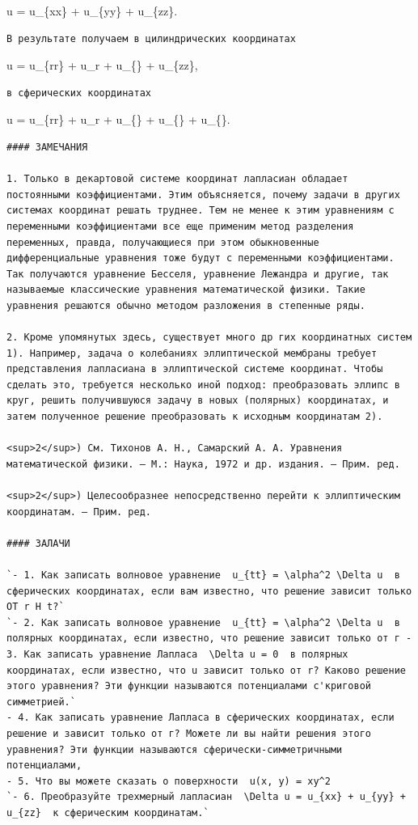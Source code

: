 \documentclass[
  ukrainian,
]{article}
\begin{document}
\Delta u = u\_\{xx\} + u\_\{yy\} + u\_\{zz\}.

\begin{verbatim}
В результате получаем в цилиндрических координатах
\end{verbatim}

\Delta u = u\_\{rr\} +  u\_r + 
u\_\{\theta\theta\} + u\_\{zz\},

\begin{verbatim}
в сферических координатах
\end{verbatim}

\Delta u = u\_\{rr\} +  u\_r + 
u\_\{\varphi\varphi\} + 
u\_\{\varphi\} +  u\_\{\theta\theta\}.

\begin{verbatim}
#### ЗАМЕЧАНИЯ

1. Только в декартовой системе координат лапласиан обладает постоянными коэффициентами. Этим объясняется, почему задачи в других системах координат решать труднее. Тем не менее к этим уравнениям с переменными коэффициентами все еще применим метод разделения переменных, правда, получающиеся при этом обыкновенные дифференциальные уравнения тоже будут с переменными коэффициентами. Так получаются уравнение Бесселя, уравнение Лежандра и другие, так называемые классические уравнения математической физики. Такие уравнения решаются обычно методом разложения в степенные ряды.

2. Кроме упомянутых здесь, существует много др гих координатных систем 1). Например, задача о колебаниях эллиптической мембраны требует представления лапласиана в эллиптической системе координат. Чтобы сделать это, требуется несколько иной подход: преобразовать эллипс в круг, решить получившуюся задачу в новых (полярных) координатах, и затем полученное решение преобразовать к исходным координатам 2).

<sup>2</sup>) См. Тихонов А. Н., Самарский А. А. Уравнения математической физики. — М.: Наука, 1972 и др. издания. — Прим. ред.

<sup>2</sup>) Целесообразнее непосредственно перейти к эллиптическим координатам. — Прим. ред.

#### ЗАЛАЧИ

`- 1. Как записать волновое уравнение  u_{tt} = \alpha^2 \Delta u  в сферических координатах, если вам известно, что решение зависит только OT r H t?`
`- 2. Как записать волновое уравнение  u_{tt} = \alpha^2 \Delta u  в полярных координатах, если известно, что решение зависит только от г - 3. Как записать уравнение Лапласа  \Delta u = 0  в полярных координатах, если известно, что u зависит только от r? Каково решение этого уравнения? Эти функции называются потенциалами с'криговой симметрией.`
- 4. Как записать уравнение Лапласа в сферических координатах, если решение и зависит только от г? Можете ли вы найти решения этого уравнения? Эти функции называются сферически-симметричными потенциалами,
- 5. Что вы можете сказать о поверхности  u(x, y) = xy^2
`- 6. Преобразуйте трехмерный лапласиан  \Delta u = u_{xx} + u_{yy} + u_{zz}  к сферическим координатам.`


\end{verbatim}
\end{document}
